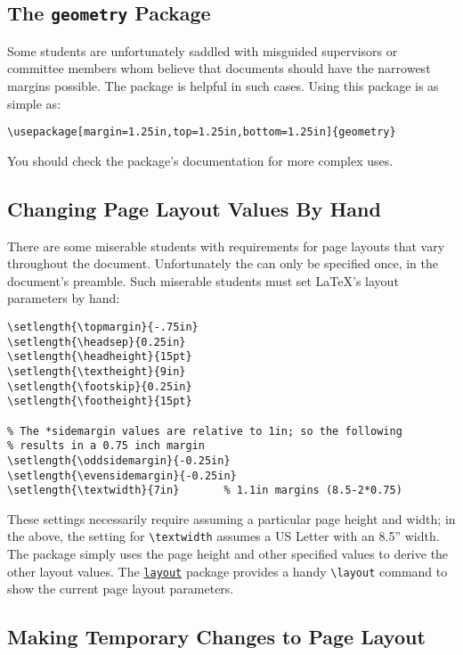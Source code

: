 \subsection{The \texttt{geometry} Package}

Some students are unfortunately saddled with misguided supervisors
or committee members whom believe that documents should have the
narrowest margins possible.  The  package is
helpful in such cases.  Using this package is as simple as:
\begin{lstlisting}
\usepackage[margin=1.25in,top=1.25in,bottom=1.25in]{geometry}
\end{lstlisting}
You should check the package's documentation for more complex uses.

\subsection{Changing Page Layout Values By Hand}

There are some miserable students with requirements for page layouts
that vary throughout the document.  Unfortunately the
 can only be specified once, in the document's
preamble.  Such miserable students must set \LaTeX's layout parameters
by hand:
\begin{lstlisting}
\setlength{\topmargin}{-.75in}
\setlength{\headsep}{0.25in}
\setlength{\headheight}{15pt}
\setlength{\textheight}{9in}
\setlength{\footskip}{0.25in}
\setlength{\footheight}{15pt}

% The *sidemargin values are relative to 1in; so the following
% results in a 0.75 inch margin
\setlength{\oddsidemargin}{-0.25in}
\setlength{\evensidemargin}{-0.25in}
\setlength{\textwidth}{7in}       % 1.1in margins (8.5-2*0.75)
\end{lstlisting}
These settings necessarily require assuming a particular page height
and width; in the above, the setting for \verb+\textwidth+ assumes
a \textsc{US} Letter with an 8.5'' width.
The  package simply uses the page height and
other specified values to derive the other layout values.
The
\href{http://tug.ctan.org/tex-archive/macros/latex/required/tools/layout.pdf}{\texttt{layout}}
package provides a
handy \verb+\layout+ command to show the current page layout
parameters. 


\subsection{Making Temporary Changes to Page Layout}

